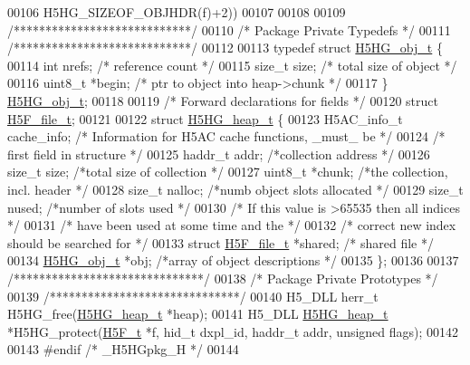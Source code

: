 \begin{DoxyCode}
00106 \textcolor{preprocessor}{                          H5HG\_SIZEOF\_OBJHDR(f)+2))}
00107 
00108 
00109 \textcolor{comment}{/****************************/}
00110 \textcolor{comment}{/* Package Private Typedefs */}
00111 \textcolor{comment}{/****************************/}
00112 
00113 \textcolor{keyword}{typedef} \textcolor{keyword}{struct }\hyperlink{struct_h5_h_g__obj__t}{H5HG\_obj\_t} \{
00114     \textcolor{keywordtype}{int}         nrefs;      \textcolor{comment}{/* reference count                  */}
00115     \textcolor{keywordtype}{size\_t}      size;       \textcolor{comment}{/* total size of object             */}
00116     uint8\_t     *begin;     \textcolor{comment}{/* ptr to object into heap->chunk   */}
00117 \} \hyperlink{struct_h5_h_g__obj__t}{H5HG\_obj\_t};
00118 
00119 \textcolor{comment}{/* Forward declarations for fields */}
00120 \textcolor{keyword}{struct }\hyperlink{struct_h5_f__file__t}{H5F\_file\_t};
00121 
00122 \textcolor{keyword}{struct }\hyperlink{struct_h5_h_g__heap__t}{H5HG\_heap\_t} \{
00123     H5AC\_info\_t cache\_info; \textcolor{comment}{/* Information for H5AC cache functions, \_must\_ be */}
00124                             \textcolor{comment}{/* first field in structure */}
00125     haddr\_t     addr;       \textcolor{comment}{/*collection address        */}
00126     \textcolor{keywordtype}{size\_t}      size;       \textcolor{comment}{/*total size of collection  */}
00127     uint8\_t     *chunk;     \textcolor{comment}{/*the collection, incl. header  */}
00128     \textcolor{keywordtype}{size\_t}      nalloc;     \textcolor{comment}{/*numb object slots allocated   */}
00129     \textcolor{keywordtype}{size\_t}      nused;      \textcolor{comment}{/*number of slots used      */}
00130                                         \textcolor{comment}{/* If this value is >65535 then all indices */}
00131                                         \textcolor{comment}{/* have been used at some time and the */}
00132                                         \textcolor{comment}{/* correct new index should be searched for */}
00133     \textcolor{keyword}{struct }\hyperlink{struct_h5_f__file__t}{H5F\_file\_t}   *shared;        \textcolor{comment}{/* shared file */}
00134     \hyperlink{struct_h5_h_g__obj__t}{H5HG\_obj\_t}    *obj;       \textcolor{comment}{/*array of object descriptions  */}
00135 \};
00136 
00137 \textcolor{comment}{/******************************/}
00138 \textcolor{comment}{/* Package Private Prototypes */}
00139 \textcolor{comment}{/******************************/}
00140 H5\_DLL herr\_t H5HG\_free(\hyperlink{struct_h5_h_g__heap__t}{H5HG\_heap\_t} *heap);
00141 H5\_DLL \hyperlink{struct_h5_h_g__heap__t}{H5HG\_heap\_t} *H5HG\_protect(\hyperlink{struct_h5_f__t}{H5F\_t} *f, hid\_t dxpl\_id, haddr\_t addr, \textcolor{keywordtype}{unsigned} flags);
00142 
00143 \textcolor{preprocessor}{#endif }\textcolor{comment}{/* \_H5HGpkg\_H */}\textcolor{preprocessor}{}
00144 
\end{DoxyCode}
